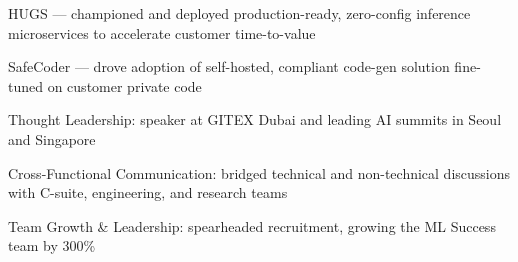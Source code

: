 \begin{cventries}
{\begin{cvitems}
      \end{cvitems}
      \vspace{2mm}
      \begin{cvsubentries}
      \end{cvsubentries}
      \vspace{4mm}
      \begin{cvitems}
        \item {HUGS --- championed and deployed production-ready, zero-config inference microservices to accelerate customer time-to-value}
        \item {SafeCoder --- drove adoption of self-hosted, compliant code-gen solution fine-tuned on customer private code}
      \end{cvitems}
      \vspace{2mm}
      \begin{cvsubentries}
      \end{cvsubentries}
      \vspace{4mm}
      \begin{cvitems}
        \item {Thought Leadership: speaker at GITEX Dubai and leading AI summits in Seoul and Singapore}
        \item {Cross-Functional Communication: bridged technical and non-technical discussions with C-suite, engineering, and research teams}
        \item {Team Growth \& Leadership: spearheaded recruitment, growing the ML Success team by 300\%}
      \end{cvitems}
    }


\end{cventries}
